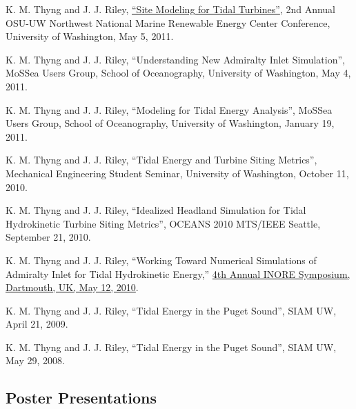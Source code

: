 \documentclass[10pt,letterpaper]{article}
\renewenvironment{itemize}{
  \begin{list}{}{
    \setlength{\leftmargin}{1.5em}
    \setlength{\itemsep}{0.25em}
    \setlength{\parskip}{0pt}
    \setlength{\parsep}{0.25em}
  }
}{
  \end{list}
}
\begin{document}
\begin{itemize}
\item K. M. Thyng and J. J. Riley, \href{http://froude.me.washington.edu/presentations/nnmrec050511.pdf}{``Site Modeling for Tidal Turbines''}, 2nd Annual OSU-UW Northwest National Marine Renewable Energy Center Conference, University of Washington, May 5, 2011.

\item K. M. Thyng and J. J. Riley, ``Understanding New Admiralty Inlet Simulation'', MoSSea Users Group, School of Oceanography, University of Washington, May 4, 2011.

\item K. M. Thyng and J. J. Riley, ``Modeling for Tidal Energy Analysis'', MoSSea Users Group, School of Oceanography, University of Washington, January 19, 2011.

\item K. M. Thyng and J. J. Riley, ``Tidal Energy and Turbine Siting Metrics'', Mechanical Engineering Student Seminar, University of Washington, October 11, 2010.

\item K. M. Thyng and J. J. Riley, ``Idealized Headland Simulation for Tidal Hydrokinetic Turbine Siting Metrics'', OCEANS 2010 MTS/IEEE Seattle, September 21, 2010.

\item K. M. Thyng and J. J. Riley, ``Working Toward Numerical Simulations of Admiralty Inlet for Tidal Hydrokinetic Energy,'' \href{http://inore.org/}{4th Annual INORE Symposium, Dartmouth, UK, May 12, 2010}.

\item K. M. Thyng and J. J. Riley, ``Tidal Energy in the Puget Sound'', SIAM UW, April 21, 2009.

\item K. M. Thyng and J. J. Riley, ``Tidal Energy in the Puget Sound'', SIAM UW, May 29, 2008.

%
%

\end{itemize}

\subsection*{Poster Presentations}
\end{document}

